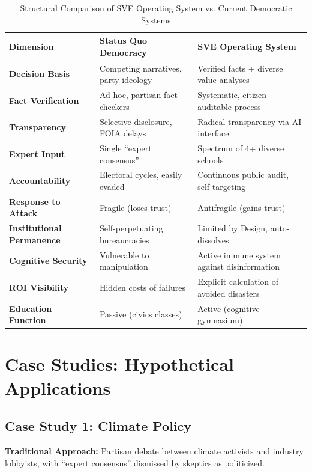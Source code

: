 \documentclass[11pt,a4paper]{article}
\begin{document}
\begin{table}[h!]
\centering
\caption{Structural Comparison of SVE Operating System vs. Current Democratic Systems}
\label{tab:comparison}
\begin{tabular}{@{}p{4cm}p{5cm}p{5cm}@{}}
\toprule
\textbf{Dimension} & \textbf{Status Quo Democracy} & \textbf{SVE Operating System} \\
\midrule
\textbf{Decision Basis} & Competing narratives, party ideology & Verified facts + diverse value analyses \\
\addlinespace
\textbf{Fact Verification} & Ad hoc, partisan fact-checkers & Systematic, citizen-auditable process \\
\addlinespace
\textbf{Transparency} & Selective disclosure, FOIA delays & Radical transparency via AI interface \\
\addlinespace
\textbf{Expert Input} & Single ``expert consensus'' & Spectrum of 4+ diverse schools \\
\addlinespace
\textbf{Accountability} & Electoral cycles, easily evaded & Continuous public audit, self-targeting \\
\addlinespace
\textbf{Response to Attack} & Fragile (loses trust) & Antifragile (gains trust) \\
\addlinespace
\textbf{Institutional Permanence} & Self-perpetuating bureaucracies & Limited by Design, auto-dissolves \\
\addlinespace
\textbf{Cognitive Security} & Vulnerable to manipulation & Active immune system against disinformation \\
\addlinespace
\textbf{ROI Visibility} & Hidden costs of failures & Explicit calculation of avoided disasters \\
\addlinespace
\textbf{Education Function} & Passive (civics classes) & Active (cognitive gymnasium) \\
\bottomrule
\end{tabular}
\end{table}

\section{Case Studies: Hypothetical Applications}
\label{app:casestudies}

\subsection*{Case Study 1: Climate Policy}

\textbf{Traditional Approach:} Partisan debate between climate activists and industry lobbyists, with ``expert consensus'' dismissed by skeptics as politicized.
\end{document}
